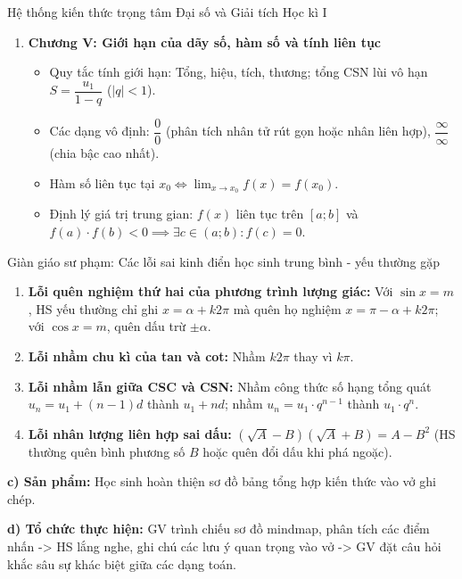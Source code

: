 \documentclass[12pt, a4paper]{article}
\begin{document}
\begin{pedabox}{Hệ thống kiến thức trọng tâm Đại số và Giải tích Học kì I}
\begin{enumerate}
        \item \textbf{Chương V: Giới hạn của dãy số, hàm số và tính liên tục}
        \begin{itemize}
            \item Quy tắc tính giới hạn: Tổng, hiệu, tích, thương; tổng CSN lùi vô hạn $S = \dfrac{u_1}{1 - q}$ ($|q| < 1$).
            \item Các dạng vô định: $\dfrac{0}{0}$ (phân tích nhân tử rút gọn hoặc nhân liên hợp), $\dfrac{\infty}{\infty}$ (chia bậc cao nhất).
            \item Hàm số liên tục tại $x_0 \iff \lim_{x \to x_0} f(x) = f(x_0)$.
            \item Định lý giá trị trung gian: $f(x)$ liên tục trên $[a; b]$ và $f(a) \cdot f(b) < 0 \implies \exists c \in (a; b): f(c) = 0$.
        \end{itemize}
    \end{enumerate}
\end{pedabox}

\begin{scaffoldbox}{Giàn giáo sư phạm: Các lỗi sai kinh điển học sinh trung bình - yếu thường gặp}
    \begin{enumerate}
        \item \textbf{Lỗi quên nghiệm thứ hai của phương trình lượng giác:} Với $\sin x = m$, HS yếu thường chỉ ghi $x = \alpha + k2\pi$ mà quên họ nghiệm $x = \pi - \alpha + k2\pi$; với $\cos x = m$, quên dấu trừ $\pm \alpha$.
        \item \textbf{Lỗi nhầm chu kì của tan và cot:} Nhầm $k2\pi$ thay vì $k\pi$.
        \item \textbf{Lỗi nhầm lẫn giữa CSC và CSN:} Nhầm công thức số hạng tổng quát $u_n = u_1 + (n-1)d$ thành $u_1 + nd$; nhầm $u_n = u_1 \cdot q^{n-1}$ thành $u_1 \cdot q^n$.
        \item \textbf{Lỗi nhân lượng liên hợp sai dấu:} $(\sqrt{A} - B)(\sqrt{A} + B) = A - B^2$ (HS thường quên bình phương số $B$ hoặc quên đổi dấu khi phá ngoặc).
    \end{enumerate}
\end{scaffoldbox}

\noindent \textbf{c) Sản phẩm:}
Học sinh hoàn thiện sơ đồ bảng tổng hợp kiến thức vào vở ghi chép.

\noindent \textbf{d) Tổ chức thực hiện:}
GV trình chiếu sơ đồ mindmap, phân tích các điểm nhấn -> HS lắng nghe, ghi chú các lưu ý quan trọng vào vở -> GV đặt câu hỏi khắc sâu sự khác biệt giữa các dạng toán.
\end{document}
